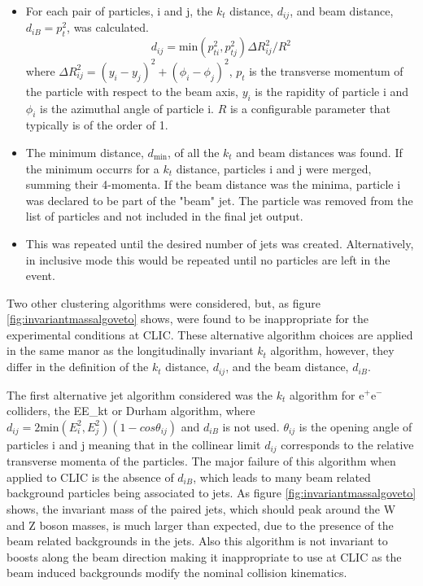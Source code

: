 \begin{itemize}
\item For each pair of particles, i and j, the $k_{t}$ distance, $d_{ij}$, and beam distance, $d_{iB} = p_{t}^{2}$, was calculated.
\begin{equation}
d_{ij} = \text{min}(p_{ti}^{2}, p_{tj}^{2}){\Delta}R^{2}_{ij}/R^{2}
\end{equation}
where ${\Delta}R^{2}_{ij} = (y_{i} - y_{j})^2 + (\phi_{i} - \phi_{j})^2$, $p_{t}$ is the transverse momentum of the particle with respect to the beam axis, $y_{i}$ is the rapidity of particle i and $\phi_{i}$ is the azimuthal angle of particle i. $R$ is a configurable parameter that typically is of the order of 1.
\item The minimum distance, $d_\text{min}$, of all the $k_{t}$ and beam distances was found.  If the minimum occurrs for a $k_{t}$ distance, particles i and j were merged, summing their 4-momenta.  If the beam distance was the minima, particle i was declared to be part of the "beam" jet.  The particle was removed from the list of particles and not included in the final jet output.
\item This was repeated until the desired number of jets was created.  Alternatively, in inclusive mode this would be repeated until no particles are left in the event.
\end{itemize}

Two other clustering algorithms were considered, but, as figure \ref{fig:invariantmassalgoveto} shows, were found to be inappropriate for the experimental conditions at CLIC.  These alternative algorithm choices are applied in the same manor as the longitudinally invariant $k_{t}$ algorithm, however, they differ in the definition of the $k_{t}$ distance, $d_{ij}$, and the beam distance, $d_{iB}$.

The first alternative jet algorithm considered was the $k_{t}$ algorithm for $\text{e}^{+}\text{e}^{-}$ colliders, the EE\_kt or Durham algorithm, where $d_{ij} = 2\text{min}(E_{i}^{2}, E_{j}^{2})(1-cos\theta_{ij})$ and $d_{iB}$ is not used.  $\theta_{ij}$ is the opening angle of particles i and j meaning that in the collinear limit $d_{ij}$ corresponds to the relative transverse momenta of the particles.  The major failure of this algorithm when applied to CLIC is the absence of $d_{iB}$, which leads to many beam related background particles being associated to jets.  As figure \ref{fig:invariantmassalgoveto} shows, the invariant mass of the paired jets, which should peak around the W and Z boson masses, is much larger than expected, due to the presence of the beam related backgrounds in the jets.  Also this algorithm is not invariant to boosts along the beam direction making it inappropriate to use at CLIC as the beam induced backgrounds modify the nominal collision kinematics.  


